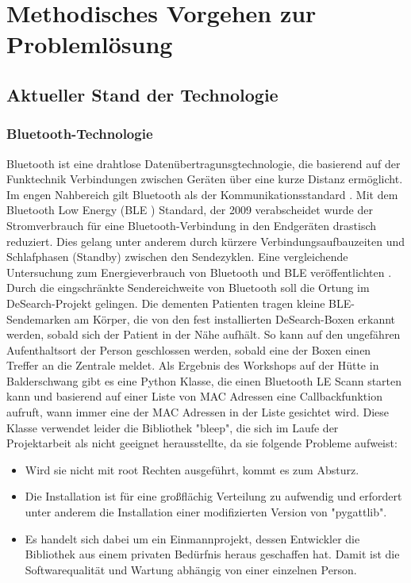 \section{Methodisches Vorgehen zur Problemlösung}

\subsection{Aktueller Stand der Technologie}

\subsubsection{Bluetooth-Technologie}\label{sssec:BLE}
Bluetooth ist eine drahtlose Datenübertragunsgtechnologie, die basierend auf der Funktechnik Verbindungen zwischen Geräten über eine kurze Distanz ermöglicht. Im engen Nahbereich gilt Bluetooth als der Kommunikationsstandard \citep[Vgl.][S. 133]{mobil-sicher}. Mit dem Bluetooth Low Energy (BLE ) Standard, der 2009 verabscheidet wurde der Stromverbrauch für eine Bluetooth-Verbindung in den Endgeräten drastisch reduziert. Dies gelang unter anderem durch kürzere Verbindungsaufbauzeiten und Schlafphasen (Standby) zwischen den Sendezyklen. Eine vergleichende Untersuchung zum Energieverbrauch von Bluetooth und BLE veröffentlichten \cite{ble-energy}. Durch die eingschränkte Sendereichweite von Bluetooth soll die Ortung im DeSearch-Projekt gelingen. Die dementen Patienten tragen kleine BLE-Sendemarken am Körper, die von den fest installierten DeSearch-Boxen erkannt werden, sobald sich der Patient in der Nähe aufhält. So kann auf den ungefähren Aufenthaltsort der Person geschlossen werden, sobald eine der Boxen einen Treffer an die Zentrale meldet. \newline
Als Ergebnis des Workshops auf der Hütte in Balderschwang gibt es eine Python Klasse, die einen Bluetooth LE Scann starten kann und basierend auf einer Liste von MAC Adressen eine Callbackfunktion aufruft, wann immer eine der MAC Adressen in der Liste gesichtet wird.
Diese Klasse verwendet leider die Bibliothek "bleep", die sich im Laufe der Projektarbeit als nicht geeignet herausstellte, da sie folgende Probleme aufweist:
\begin{itemize}
	\item Wird sie nicht mit root Rechten ausgeführt, kommt es zum Absturz.
	\item Die Installation ist für eine großflächig Verteilung zu aufwendig und erfordert unter anderem die Installation einer modifizierten Version von "pygattlib". \cite{bleep-installation}
	\item Es handelt sich dabei um ein Einmannprojekt, dessen Entwickler die Bibliothek aus einem privaten Bedürfnis heraus geschaffen hat. Damit ist die Softwarequalität und Wartung abhängig von einer einzelnen Person.
\end{itemize}
